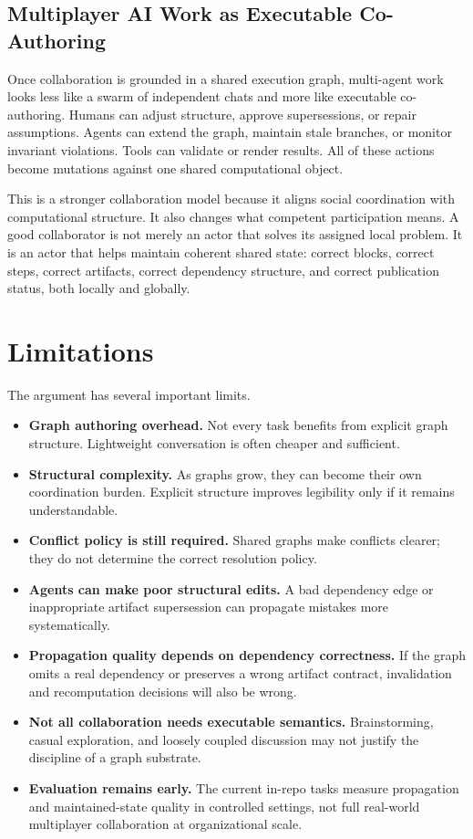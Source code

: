\documentclass{article}
\begin{document}
\subsection{Multiplayer AI Work as Executable Co-Authoring}

Once collaboration is grounded in a shared execution graph, multi-agent work looks less like a swarm of independent chats and more like executable co-authoring. Humans can adjust structure, approve supersessions, or repair assumptions. Agents can extend the graph, maintain stale branches, or monitor invariant violations. Tools can validate or render results. All of these actions become mutations against one shared computational object.

This is a stronger collaboration model because it aligns social coordination with computational structure. It also changes what competent participation means. A good collaborator is not merely an actor that solves its assigned local problem. It is an actor that helps maintain coherent shared state: correct blocks, correct steps, correct artifacts, correct dependency structure, and correct publication status, both locally and globally.

\section{Limitations}

The argument has several important limits.

\begin{itemize}
\item \textbf{Graph authoring overhead.} Not every task benefits from explicit graph structure. Lightweight conversation is often cheaper and sufficient.
\item \textbf{Structural complexity.} As graphs grow, they can become their own coordination burden. Explicit structure improves legibility only if it remains understandable.
\item \textbf{Conflict policy is still required.} Shared graphs make conflicts clearer; they do not determine the correct resolution policy.
\item \textbf{Agents can make poor structural edits.} A bad dependency edge or inappropriate artifact supersession can propagate mistakes more systematically.
\item \textbf{Propagation quality depends on dependency correctness.} If the graph omits a real dependency or preserves a wrong artifact contract, invalidation and recomputation decisions will also be wrong.
\item \textbf{Not all collaboration needs executable semantics.} Brainstorming, casual exploration, and loosely coupled discussion may not justify the discipline of a graph substrate.
\item \textbf{Evaluation remains early.} The current in-repo tasks measure propagation and maintained-state quality in controlled settings, not full real-world multiplayer collaboration at organizational scale.
\end{itemize}
\end{document}
